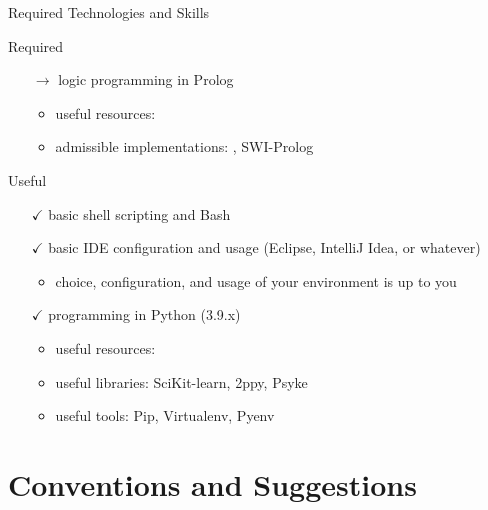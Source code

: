 \documentclass[presentation]{beamer}\mode<presentation>{\usetheme{AMSBolognaFC}}
\begin{document}
\begin{frame}[c,allowframebreaks]{Required Technologies and Skills}
\begin{alertblock}{Required}
\begin{itemize}
		\item[$\rightarrow$] logic programming in Prolog
		\begin{itemize}
			\item useful resources: 
			\item admissible implementations: \alert{\twopkt{}}, SWI-Prolog
		\end{itemize}

	\end{itemize}
\end{alertblock}

\begin{exampleblock}{Useful}
	\begin{itemize}
		\item[$\checkmark$] basic shell scripting and \alert{Bash}
		\item[$\checkmark$] basic IDE configuration and usage (\alert{Eclipse}, \alert{IntelliJ Idea}, or whatever)
		\begin{itemize}
			\item choice, configuration, and usage of your environment is up to you
		\end{itemize}
		\item[$\checkmark$] programming in Python (3.9.x)
		\begin{itemize}
			\item useful resources: 
			\item useful libraries: SciKit-learn, 2ppy, Psyke
			\item useful tools: Pip, Virtualenv, Pyenv
		\end{itemize}
	\end{itemize}
\end{exampleblock}

\end{frame}

\section{Conventions and Suggestions}
\end{document}
